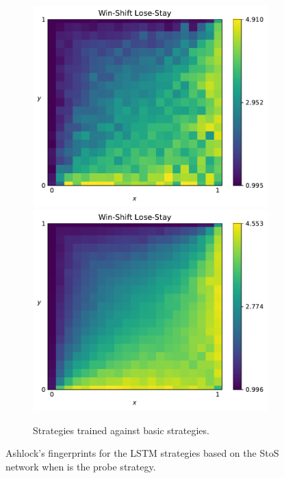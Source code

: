 \begin{figure}[!htbp]
\begin{subfigure}{\textwidth}
        \includegraphics[width=.3\textwidth]{src/chapters/07/img/win_shift_lose_stay_basic_sequence_1.pdf}
        \includegraphics[width=.3\textwidth]{src/chapters/07/img/win_shift_lose_stay_basic_sequence_0_78.pdf}
        \caption{Strategies trained against basic strategies.}
    \end{subfigure}
    \caption{Ashlock's fingerprints for the LSTM strategies based on the StoS
    network when \Pavlov is the probe strategy.}\label{fig:ashlock_fingerprints_pavlov_s_to_s}
\end{figure}

